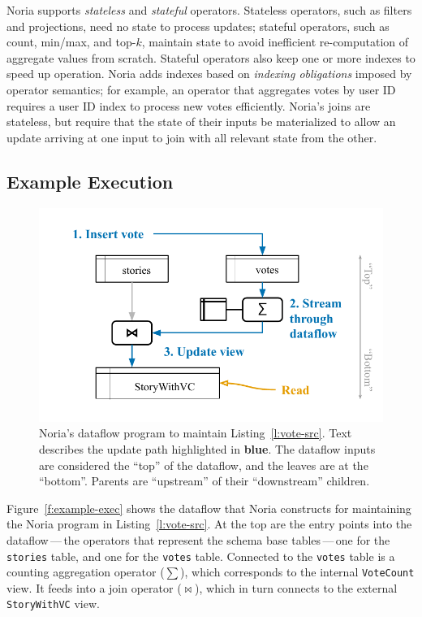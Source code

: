 Noria supports \emph{stateless} and \emph{stateful} operators. Stateless
operators, such as filters and projections, need no state to process updates;
stateful operators, such as count, min/max, and top-$k$, maintain state to avoid
inefficient re-computation of aggregate values from scratch. Stateful operators
also keep one or more indexes to speed up operation. Noria adds indexes based on
\emph{indexing obligations} imposed by operator semantics; for example, an
operator that aggregates votes by user ID requires a user ID index to process
new votes efficiently. Noria's joins are stateless, but require that the state
of their inputs be materialized to allow an update arriving at one input to join
with all relevant state from the other.

\subsection*{Example Execution}

\begin{figure}[t]
  \centering
  \includegraphics{diagrams/Example Execution.pdf}
  \caption{Noria's dataflow program to maintain Listing~\ref{l:vote-src}. Text
  describes the update path highlighted in \textbf{\color{set1}blue}. The
  dataflow inputs are considered the ``top'' of the dataflow, and the leaves are
  at the ``bottom''. Parents are ``upstream'' of their ``downstream'' children.}
  \label{f:example-exec}
\end{figure}

Figure~\vref{f:example-exec} shows the dataflow that Noria constructs for
maintaining the Noria program in Listing~\vref{l:vote-src}. At the top are the
entry points into the dataflow\,---\,the operators that represent the schema
base tables\,---\,one for the \texttt{stories} table, and one for the
\texttt{votes} table. Connected to the \texttt{votes} table is a counting
aggregation operator ($\sum$), which corresponds to the internal
\texttt{VoteCount} view. It feeds into a join operator ($\bowtie$), which in
turn connects to the external \texttt{StoryWithVC} view.

